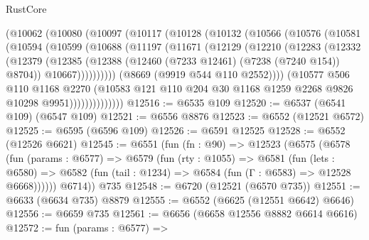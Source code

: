 \begin{lexlean}{RustCore}
\begin{coremodule}
            (@10062
              (@10080
                (@10097
                  (@10117
                    (@10128
                      (@10132
                        (@10566
                          (@10576
                            (@10581
                              (@10594
                                (@10599
                                  (@10688
                                    (@11197
                                      (@11671
                                        (@12129
                                          (@12210
                                            (@12283
                                              (@12332
                                                (@12379
                                                  (@12385
                                                    (@12388
                                                      (@12460
                                                        (@7233 @12461)
                                                        (@7238 (@7240 @154))
                                                        @8704))
                                                    @10667))))))))))
                                (@8669 (@9919 @544 @110 @2552))))
                            (@10577
                              @506
                              @110
                              @1168
                              @2270
                              (@10583
                                @121
                                @110
                                @204
                                @30
                                @1168
                                @1259
                                @2268
                                @9826
                                @10298
                                @9951))))))))))))))
@12516 := @6535 @109
@12520 := @6537 (@6541 @109) (@6547 @109)
@12521 := @6556 @8876
@12523 := @6552 (@12521 @6572)
@12525 := @6595 (@6596 @109)
@12526 := @6591 @12525
@12528 := @6552 (@12526 @6621)
@12545 := @6551
    (fun (fn : @90) =>
    @12523
      (@6575
        (@6578
          (fun (params : @6577) =>
          @6579
            (fun (rty : @1055) =>
            @6581
              (fun (lets : @6580) =>
              @6582 (fun (tail : @1234) => @6584 (fun (Γ : @6583) => @12528 @6668))))))
        @6714))
    @735
@12548 := @6720 (@12521 (@6570 @735))
@12551 := @6633 (@6634 @735) @8879
@12555 := @6552 (@6625 (@12551 @6642) @6646)
@12556 := @6659 @735
@12561 := @6656 (@6658 @12556 @8882 @6614 @6616)
@12572 := fun (params : @6577) =>

\end{coremodule}
\end{lexlean}
